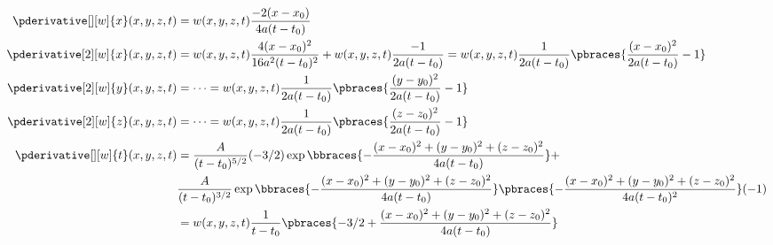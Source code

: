 \begin{solution}
\begin{enumerate}[label = (\roman*)]
    \begin{align*}
        \pderivative[][w]{x}(x, y, z, t)
        & =
        w(x, y, z, t)
        \frac{-2 (x - x_0)}{4a (t - t_0)} \\
        \pderivative[2][w]{x}(x, y, z, t)
        & =
        w(x, y, z, t)
        \frac{4 (x - x_0)^2}{16 a^2 (t - t_0)^2}
        +
        w(x, y, z, t)
        \frac{-1}{2a (t - t_0)}
        =
        w(x, y, z, t)
        \frac{1}{2a (t - t_0)}
        \pbraces
        {
            \frac{(x - x_0)^2}{2a (t - t_0)} - 1
        } \\
        \pderivative[2][w]{y}(x, y, z, t)
        & = \cdots =
        w(x, y, z, t)
        \frac{1}{2a (t - t_0)}
        \pbraces
        {
            \frac{(y - y_0)^2}{2a (t - t_0)} - 1
        } \\
        \pderivative[2][w]{z}(x, y, z, t)
        & = \cdots =
        w(x, y, z, t)
        \frac{1}{2a (t - t_0)}
        \pbraces
        {
            \frac{(z - z_0)^2}{2a (t - t_0)} - 1
        } \\
        \pderivative[][w]{t}(x, y, z, t)
        & =
        \frac{A}{(t - t_0)^{5/2}}
        (-3/2)
        \exp
        {
            \bbraces
            {
                -\frac
                {
                    (x - x_0)^2
                    +
                    (y - y_0)^2
                    +
                    (z - z_0)^2
                }{
                    4 a (t - t_0)
                }
            }
        }
        + \\
        & \frac{A}{(t - t_0)^{3/2}}
        \exp
        {
            \bbraces
            {
                -\frac
                {
                    (x - x_0)^2
                    +
                    (y - y_0)^2
                    +
                    (z - z_0)^2
                }{
                    4 a (t - t_0)
                }
            }
        }
        \pbraces
        {
            -\frac
            {
                (x - x_0)^2
                +
                (y - y_0)^2
                +
                (z - z_0)^2
            }{
                4 a (t - t_0)^2
            }
        }
        (-1) \\
        & =
        w(x, y, z, t)
        \frac{1}{t - t_0}
        \pbraces
        {
            -3/2
            +
            \frac
            {
                (x - x_0)^2
                +
                (y - y_0)^2
                +
                (z - z_0)^2
            }{
                4 a (t - t_0)
            }
        }        
    \end{align*}


\end{enumerate}
\end{solution}
